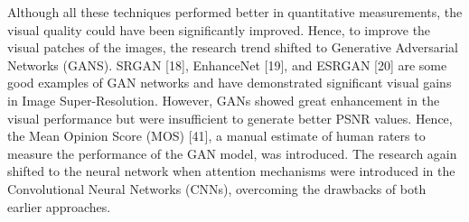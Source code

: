 \documentclass[twocolumn]{svjour3}          %
\begin{document}
Although all these techniques performed better in quantitative measurements, the visual quality could have been significantly improved. Hence, to improve the visual patches of the images, the research trend shifted to Generative Adversarial Networks (GANS). SRGAN [18], EnhanceNet [19], and ESRGAN [20] are some good examples of GAN networks and have demonstrated significant visual gains in Image Super-Resolution. However, GANs showed great enhancement in the visual performance but were insufficient to generate better PSNR values. Hence, the Mean Opinion Score (MOS) [41], a manual estimate of human raters to measure the performance of the GAN model, was introduced. The research again shifted to the neural network when attention mechanisms were introduced in the Convolutional Neural Networks (CNNs), overcoming the drawbacks of both earlier approaches. 
\end{document}
